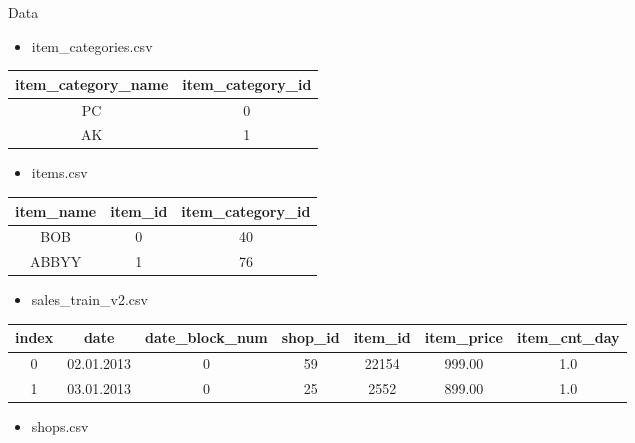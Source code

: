 \documentclass[
 size=12pt,
 paper=smartboard, %
 mode=present, %
 display=slides, %
style=tuliplab,
pauseslide,
fleqn,leqno]{powerdot}
\begin{document}
\begin{slide}{Data}

  \begin{itemize}
    \item item_categories.csv
    \end{itemize}

\begin{tabular}{|c|c|}%

item_category_name&item_category_id\\%
 \hline
PC&	0\\
 \hline
AK&	1
\end{tabular}

    \begin{itemize}
    \item items.csv
    \end{itemize}

    \begin{tabular}{|c|c|c|}%

item_name&item_id&item_category_id\\%
 \hline
BOB&0	&40 \\
 \hline
ABBYY&1&76  \\
\end{tabular}

    \begin{itemize}
    \item sales_train_v2.csv
    \end{itemize}

   \begin{tabular}{|c|c|c|c|c|c|c|}%

index&date&date_block_num&shop_id&item_id&item_price&item_cnt_day\\%
 \hline
0&	02.01.2013	&0  &59 &22154  &999.00	 &1.0\\
 \hline
1&	03.01.2013	&0  &25	&2552   &899.00	 &1.0\\
\end{tabular}

    \begin{itemize}
    \item shops.csv
    \end{itemize}

    \begin{tabular}{|c|c|}%


\end{tabular}
\end{slide}
\end{document}
